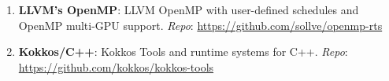\begin{enumerate}
\item \textbf{LLVM's OpenMP}: LLVM OpenMP with user-defined schedules and OpenMP multi-GPU support. \textit{Repo}: \url{https://github.com/sollve/openmp-rts}
\item \textbf{Kokkos/C++}: Kokkos Tools and runtime systems for C++. \textit{Repo}: \url{https://github.com/kokkos/kokkos-tools}
\end{enumerate}
